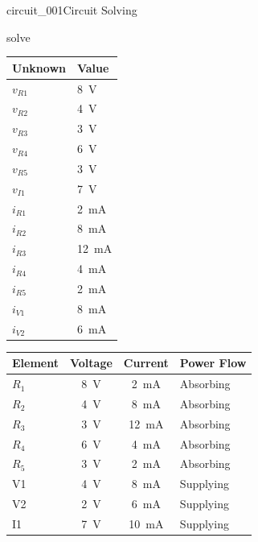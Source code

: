 \begin{mainquestion}{circuit_001}{Circuit Solving}
\begin{partquestion}{solve}
\begin{answer}
\begin{table}[htbp]
\begin{minipage}[t]{0.37\textwidth}
\centering
\begin{tabular}{|l|l|}
\hline
Unknown & Value \\ \hline
$v_{R1}$ & \qty{8}{\volt} \\ \hline
$v_{R2}$ & \qty{4}{\volt} \\ \hline
$v_{R3}$ & \qty{3}{\volt} \\ \hline
$v_{R4}$ & \qty{6}{\volt} \\ \hline
$v_{R5}$ & \qty{3}{\volt} \\ \hline
$v_{I1}$ & \qty{7}{\volt} \\ \hline
$i_{R1}$ & \qty{2}{\milli\ampere} \\ \hline
$i_{R2}$ & \qty{8}{\milli\ampere} \\ \hline
$i_{R3}$ & \qty{12}{\milli\ampere} \\ \hline
$i_{R4}$ & \qty{4}{\milli\ampere} \\ \hline
$i_{R5}$ & \qty{2}{\milli\ampere} \\ \hline
$i_{V1}$ & \qty{8}{\milli\ampere} \\ \hline
$i_{V2}$ & \qty{6}{\milli\ampere} \\ \hline
\end{tabular}
\end{minipage}
\hfill
\begin{minipage}[t]{0.60\textwidth}
\centering
\begin{tabular}{|l|c|c|l|}
\hline
Element & Voltage & Current & Power Flow \\ \hline
$R_1$ & \qty{8}{\volt} & \qty{2}{\milli\ampere} & Absorbing \\ \hline
$R_2$ & \qty{4}{\volt} & \qty{8}{\milli\ampere} & Absorbing \\ \hline
$R_3$ & \qty{3}{\volt} & \qty{12}{\milli\ampere} & Absorbing \\ \hline
$R_4$ & \qty{6}{\volt} & \qty{4}{\milli\ampere} & Absorbing \\ \hline
$R_5$ & \qty{3}{\volt} & \qty{2}{\milli\ampere} & Absorbing \\ \hline
V1 & \qty{4}{\volt} & \qty{8}{\milli\ampere} & Supplying \\ \hline
V2 & \qty{2}{\volt} & \qty{6}{\milli\ampere} & Supplying \\ \hline
I1 & \qty{7}{\volt} & \qty{10}{\milli\ampere} & Supplying \\ \hline
\end{tabular}
\end{minipage}


\end{table}
\end{answer}
\end{partquestion}
\end{mainquestion}
